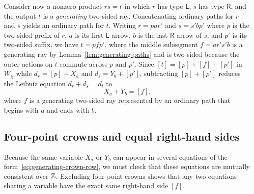 Consider now a nonzero product $rs=t$ in which $r$ has type $\mathsf L$, $s$ has type $\mathsf R$, and the output $t$ is a \emph{generating} two-sided ray. Concatenating ordinary paths for $r$ and $s$ yields an ordinary path for $t$. Writing $r=pa r'$ and $s=s'bp'$ where $p$ is the two-sided prefix of $r$, $a$ is its first $\mathsf L$-arrow, $b$ is the last $\mathsf R$-arrow of $s$, and $p'$ is its two-sided suffix, we have $t=pfp'$, where the middle subsegment $f=ar's'b$ is a generating ray by Lemma~\ref{lem:generating-paths} and is two-sided because the outer actions on $t$ commute across $p$ and $p'$. Since $[t]=[p]+[f]+[p']$ in $W_\chi$ while $d_r=[p]+X_a$ and $d_s=Y_b+[p']$, subtracting $[p]+[p']$ reduces the Leibniz equation $d_r+d_s=d_t$ to
\begin{equation}
  X_a+Y_b=[f],
  \label{eq:generating-crown-row}
\end{equation}
where $f$ is a generating two-sided ray represented by an ordinary path that begins with $a$ and ends with $b$.

\subsection{Four-point crowns and equal right-hand sides}

Because the same variable $X_a$ or $Y_b$ can appear in several equations of the form~\eqref{eq:generating-crown-row}, we must check that these equations are mutually consistent over $\mathbb Z$. Excluding four-point crowns shows that any two equations sharing a variable have the exact same right-hand side $[f]$.

